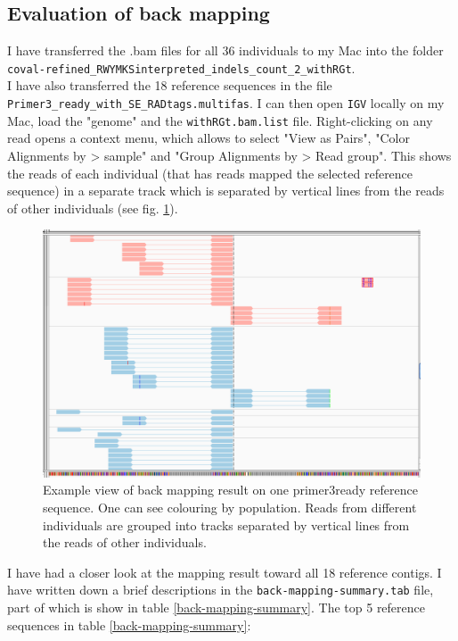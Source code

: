 \documentclass{article}\usepackage[]{graphicx}\usepackage[]{color}
\begin{document}
\subsection{Evaluation of back mapping}

I have transferred the .bam files for all 36 individuals to my Mac into the folder \\
\texttt{coval-refined\_RWYMKSinterpreted\_indels\_count\_2\_withRGt}. 
\\
I have also transferred the 18 reference sequences in the file \texttt{Primer3\_ready\_with\_SE\_RADtags.multifas}. I can then open \texttt{IGV} locally on my Mac, load the "genome" and the \texttt{withRGt.bam.list} file. Right-clicking on any read opens a context menu, which allows to select "View as Pairs", "Color Alignments by >  sample" and "Group Alignments by > Read group". This shows the reads of each individual (that has reads mapped the selected reference sequence) in a separate track which is separated by vertical lines from the reads of other individuals (see fig. \ref{IGV-view_group-by-RG}).

\begin{figure}
\centering
\includegraphics[width=\textwidth]{./figure/IGV-view_group-by-RG}
\caption{Example view of back mapping result on one primer3ready reference sequence. One can see colouring by population. Reads from different individuals are grouped into tracks separated by vertical lines from the reads of other individuals.}
\label{IGV-view_group-by-RG}
\end{figure}

I have had a closer look at the mapping result toward all 18 reference contigs. I have written down a brief descriptions in the \texttt{back-mapping-summary.tab} file, part of which is show in table \ref{back-mapping-summary}. The top 5 reference sequences in table \ref{back-mapping-summary}:
\end{document}
